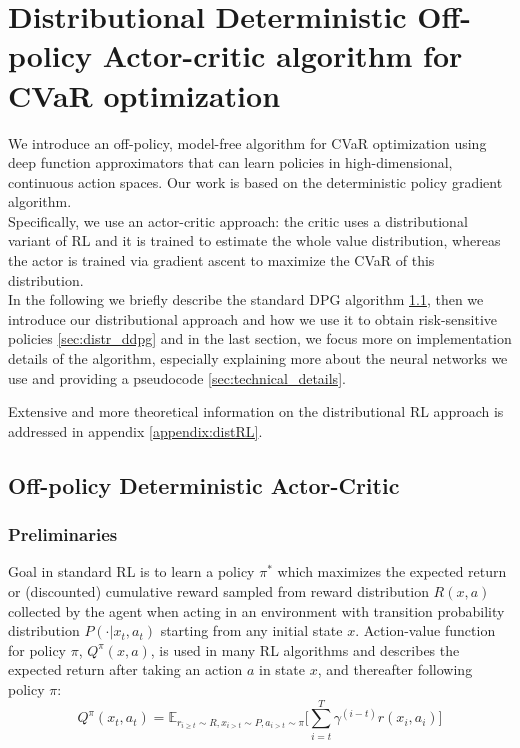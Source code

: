 \chapter{Distributional Deterministic Off-policy Actor-critic algorithm for CVaR optimization}
\label{chapter:algo}

We introduce an off-policy, model-free algorithm for CVaR optimization using deep function approximators
that can learn policies in high-dimensional, continuous action spaces.
Our work is based on the deterministic policy gradient algorithm.\\
Specifically, we use an actor-critic approach: the critic uses a distributional variant
of RL and it is trained to estimate the whole value distribution, whereas the actor
is trained via gradient ascent to maximize the CVaR of this distribution.\\ 
In the following we briefly describe the standard DPG algorithm \ref{sec:DPG}, then we introduce
our distributional approach and how we use it to obtain risk-sensitive policies \ref{sec:distr_ddpg}
and in the last section, we focus more on implementation details of the algorithm, 
especially explaining more about the neural networks we use and providing a
pseudocode \ref{sec:technical_details}.

Extensive and more theoretical information on the distributional RL approach is addressed in 
appendix \ref{appendix:distRL}.

\section{Off-policy Deterministic Actor-Critic} \label{sec:DPG} 
\subsection{Preliminaries}

Goal in standard RL is to learn a policy $\pi^*$ which maximizes the expected return or (discounted) cumulative
reward sampled from reward distribution $R(x,a)$ collected by the agent when acting in an environment with transition probability distribution $P(\cdot| x_{t},a_t)$ starting from any initial state $x$.
Action-value function for policy $\pi$, $Q^\pi(x,a)$, is used in many RL algorithms and describes the expected return after taking
an action $a$ in state $x$, and thereafter following policy $\pi$:
\begin{equation}
    Q^\pi(x_t,a_t) = \mathbb E_{r_{i\geq t}\sim R,x_{i>t} \sim P, a_{i>t}\sim \pi}\Big[  \sum_{i=t}^T \gamma^{(i-t)}r(x_i,a_i) \Big]
\end{equation}

